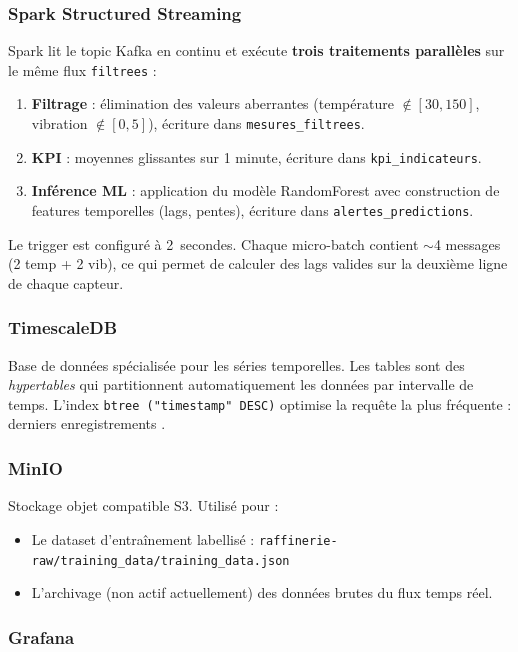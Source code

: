 \documentclass[11pt,a4paper]{article}
\begin{document}
\subsubsection{Spark Structured Streaming}

Spark lit le topic Kafka en continu et exécute \textbf{trois traitements parallèles} sur le même flux \texttt{filtrees} :

\begin{enumerate}
    \item \textbf{Filtrage} : élimination des valeurs aberrantes (température $\notin [30, 150]$, vibration $\notin [0, 5]$), écriture dans \texttt{mesures\_filtrees}.
    \item \textbf{KPI} : moyennes glissantes sur 1 minute, écriture dans \texttt{kpi\_indicateurs}.
    \item \textbf{Inférence ML} : application du modèle RandomForest avec construction de features temporelles (lags, pentes), écriture dans \texttt{alertes\_predictions}.
\end{enumerate}

Le trigger est configuré à 2~secondes. Chaque micro-batch contient $\sim$4 messages (2 temp + 2 vib), ce qui permet de calculer des lags valides sur la deuxième ligne de chaque capteur.

\subsubsection{TimescaleDB}

Base de données spécialisée pour les séries temporelles. Les tables sont des \emph{hypertables} qui partitionnent automatiquement les données par intervalle de temps. L'index \texttt{btree ("timestamp" DESC)} optimise la requête la plus fréquente : \og derniers enregistrements \fg.

\subsubsection{MinIO}

Stockage objet compatible S3. Utilisé pour :
\begin{itemize}
    \item Le dataset d'entraînement labellisé : \texttt{raffinerie-raw/training\_data/training\_data.json}
    \item L'archivage (non actif actuellement) des données brutes du flux temps réel.
\end{itemize}

\subsubsection{Grafana}
\end{document}
